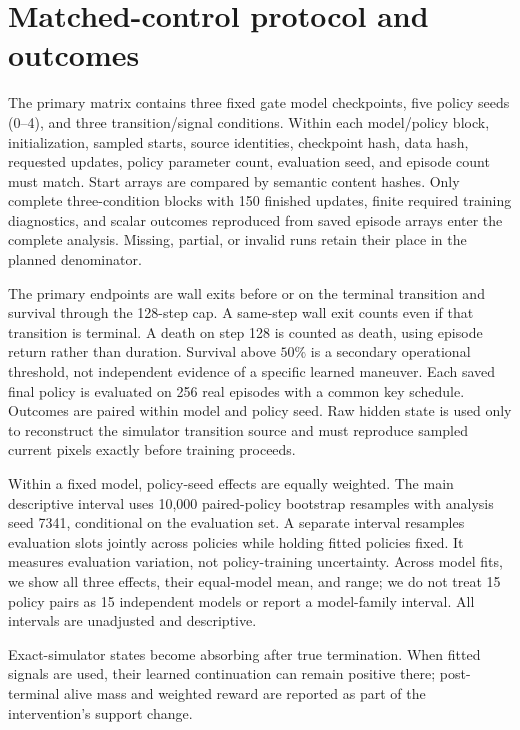 
\section{Matched-control protocol and outcomes}
\label{app:matched}
The primary matrix contains three fixed gate model checkpoints, five policy seeds (0--4), and
three transition/signal conditions. Within each model/policy block, initialization, sampled starts,
source identities, checkpoint hash, data hash, requested updates, policy parameter count, evaluation
seed, and episode count must match. Start arrays are compared by semantic content hashes. Only
complete three-condition blocks with 150 finished updates, finite required training diagnostics,
and scalar outcomes reproduced from saved episode arrays enter the complete analysis. Missing,
partial, or invalid runs retain their place in the planned denominator.

The primary endpoints are wall exits before or on the terminal transition and survival
through the 128-step cap. A same-step wall exit counts even if that transition is terminal. A death on step 128 is
counted as death, using episode return rather than duration. Survival above $50\%$ is a secondary
operational threshold, not independent evidence of a specific learned maneuver. Each saved
final policy is evaluated on 256 real episodes with a common key schedule. Outcomes are paired
within model and policy seed. Raw hidden state is used only to reconstruct the simulator transition
source and must reproduce sampled current pixels exactly before training proceeds.

Within a fixed model, policy-seed effects are equally weighted. The main descriptive interval uses
10,000 paired-policy bootstrap resamples with analysis seed 7341, conditional on the evaluation set.
A separate interval resamples evaluation slots jointly across policies while holding fitted policies
fixed. It measures evaluation variation, not policy-training uncertainty. Across model fits, we
show all three effects, their equal-model mean, and range; we do not treat 15 policy pairs as 15
independent models or report a model-family interval. All intervals are unadjusted and descriptive.

Exact-simulator states become absorbing after true termination. When fitted
signals are used, their learned continuation can remain positive there; post-terminal alive mass
and weighted reward are reported as part of the intervention's support change.

